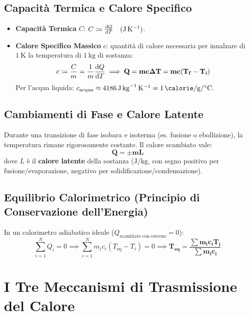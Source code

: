 \subsection{Capacità Termica e Calore Specifico}
\begin{itemize}
    \item \textbf{Capacità Termica} $C$: $C \coloneqq \frac{\mathrm{d} Q}{\mathrm{d} T} \quad (\si{\joule\per\kelvin})$.
    \item \textbf{Calore Specifico Massico} $c$: quantità di calore necessaria per innalzare di $\SI{1}{\kelvin}$ la temperatura di $\SI{1}{\kilogram}$ di sostanza:
    \begin{equation}
        c \coloneqq \frac{C}{m} = \frac{1}{m}\frac{\mathrm{d} Q}{\mathrm{d} T} \implies \mathbf{Q = m c \Delta T = m c (T_f - T_i)}
        \label{eq:calore_sensibile}
    \end{equation}
    Per l'acqua liquida: $c_{\text{acqua}} \approx \SI{4186}{\joule\per\kilogram\per\kelvin} = \SI{1}{\calorie\per\gram\per\celsius}$.
\end{itemize}

\subsection{Cambiamenti di Fase e Calore Latente}
Durante una transizione di fase isobara e isoterma (es. fusione o ebollizione), la temperatura rimane rigorosamente costante. Il calore scambiato vale:
\begin{equation}
    \mathbf{Q = \pm m L}
    \label{eq:calore_latente}
\end{equation}
dove $L$ è il \textbf{calore latente} della sostanza ($\si{\joule\per\kilogram}$, con segno positivo per fusione/evaporazione, negativo per solidificazione/condensazione).

\subsection{Equilibrio Calorimetrico (Principio di Conservazione dell'Energia)}
In un calorimetro adiabatico ideale ($Q_{\text{scambiato con esterno}} = 0$):
\begin{equation}
    \sum_{i=1}^N Q_i = 0 \implies \sum_{i=1}^N m_i c_i (T_{\text{eq}} - T_i) = 0 \implies \mathbf{T_{\text{eq}} = \frac{\sum m_i c_i T_i}{\sum m_i c_i}}
    \label{eq:temperatura_equilibrio}
\end{equation}

\section{I Tre Meccanismi di Trasmissione del Calore}
\label{sec:trasmissione_calore}

